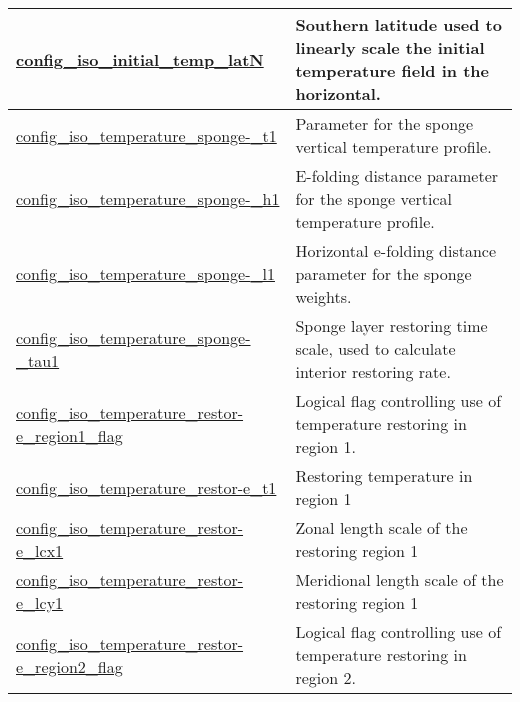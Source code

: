 {\begin{center}
\begin{longtable}{| p{2.0in} || p{4.0in} |}
    \hline
    \hyperref[subsec:nm_sec_config_iso_initial_temp_latN]{config\_iso\_initial\_temp\_latN} & Southern latitude used to linearly scale the initial temperature field in the horizontal. \\
    \hline
    \hyperref[subsec:nm_sec_config_iso_temperature_sponge_t1]{config\_iso\_temperature\_sponge-}\hyperref[subsec:nm_sec_config_iso_temperature_sponge_t1]{\_t1}& Parameter for the sponge vertical temperature profile. \\
    \hline
    \hyperref[subsec:nm_sec_config_iso_temperature_sponge_h1]{config\_iso\_temperature\_sponge-}\hyperref[subsec:nm_sec_config_iso_temperature_sponge_h1]{\_h1}& E-folding distance parameter for the sponge vertical temperature profile. \\
    \hline
    \hyperref[subsec:nm_sec_config_iso_temperature_sponge_l1]{config\_iso\_temperature\_sponge-}\hyperref[subsec:nm_sec_config_iso_temperature_sponge_l1]{\_l1}& Horizontal e-folding distance parameter for the sponge weights. \\
    \hline
    \hyperref[subsec:nm_sec_config_iso_temperature_sponge_tau1]{config\_iso\_temperature\_sponge-}\hyperref[subsec:nm_sec_config_iso_temperature_sponge_tau1]{\_tau1}& Sponge layer restoring time scale, used to calculate interior restoring rate. \\
    \hline
    \hyperref[subsec:nm_sec_config_iso_temperature_restore_region1_flag]{config\_iso\_temperature\_restor-}\hyperref[subsec:nm_sec_config_iso_temperature_restore_region1_flag]{e\_region1\_flag}& Logical flag controlling use of temperature restoring in region 1. \\
    \hline
    \hyperref[subsec:nm_sec_config_iso_temperature_restore_t1]{config\_iso\_temperature\_restor-}\hyperref[subsec:nm_sec_config_iso_temperature_restore_t1]{e\_t1}& Restoring temperature in region 1 \\
    \hline
    \hyperref[subsec:nm_sec_config_iso_temperature_restore_lcx1]{config\_iso\_temperature\_restor-}\hyperref[subsec:nm_sec_config_iso_temperature_restore_lcx1]{e\_lcx1}& Zonal length scale of the restoring region 1 \\
    \hline
    \hyperref[subsec:nm_sec_config_iso_temperature_restore_lcy1]{config\_iso\_temperature\_restor-}\hyperref[subsec:nm_sec_config_iso_temperature_restore_lcy1]{e\_lcy1}& Meridional length scale of the restoring region 1 \\
    \hline
    \hyperref[subsec:nm_sec_config_iso_temperature_restore_region2_flag]{config\_iso\_temperature\_restor-}\hyperref[subsec:nm_sec_config_iso_temperature_restore_region2_flag]{e\_region2\_flag}& Logical flag controlling use of temperature restoring in region 2. \\

\end{longtable}
\end{center}}
